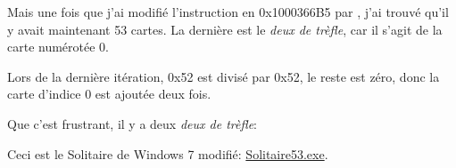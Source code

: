 Mais une fois que j'ai modifié l'instruction  en 0x1000366B5 par
, j'ai trouvé qu'il y avait maintenant 53 cartes.
La dernière est le \textit{deux de trèfle}, car il s'agit de la carte numérotée
0.

Lors de la dernière itération, 0x52 est divisé par 0x52, le reste est zéro, donc
la carte d'indice 0 est ajoutée deux fois.

Que c'est frustrant, il y a deux \textit{deux de trèfle}:

\begin{figure}[H]
\centering
{}
\end{figure}

Ceci est le Solitaire de Windows 7 modifié:
\href{\RepoURL/examples/solitaire/53/Solitaire53.exe}{Solitaire53.exe}.

